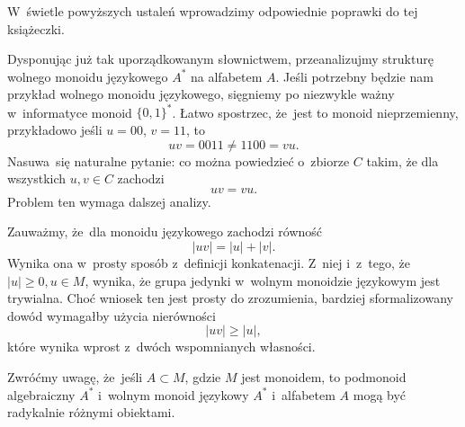 \documentclass[a4paper,11pt]{article}
\begin{document}
W~świetle powyższych ustaleń wprowadzimy odpowiednie poprawki do tej
książeczki.

\vspace{\spaceFour}





\start {} Dysponując już tak uporządkowanym słownictwem,
przeanalizujmy strukturę wolnego monoidu językowego $A^{ * }$ na
alfabetem $A$. Jeśli potrzebny będzie nam przykład wolnego monoidu
językowego, sięgniemy po niezwykle ważny w~informatyce monoid
$\{ 0, 1 \}^{ * }$. Łatwo spostrzec, że~jest to monoid nieprzemienny,
przykładowo jeśli $u = 00$, $v = 11$, to
\begin{equation}
  \label{eq:Forys-Forys-05}
  u v = 0011 \neq 1100 = vu.
\end{equation}
Nasuwa~się naturalne pytanie: co można powiedzieć o~zbiorze $C$ takim,
że dla wszystkich $u, v \in C$ zachodzi
\begin{equation}
  \label{eq:Forys-Forys-06}
  uv = vu.
\end{equation}
Problem ten wymaga dalszej analizy.

Zauważmy, że~dla monoidu językowego zachodzi równość
\begin{equation}
  \label{eq:Forys-Forys-07}
  | u v | = | u | + | v |.
\end{equation}
Wynika ona w~prosty sposób z~definicji konkatenacji. Z~niej i~z~tego,
że~$| u | \geq 0, u \in M$, wynika, że grupa jedynki w~wolnym
monoidzie językowym jest trywialna. Choć wniosek ten jest prosty do
zrozumienia, bardziej sformalizowany dowód wymagałby użycia
nierówności
\begin{equation}
  \label{eq:Forys-Forys-08}
  | u v | \geq | u |,
\end{equation}
które wynika wprost z~dwóch wspomnianych własności.

\vspace{\spaceFour}





 Zwróćmy uwagę, że~jeśli $A \subset M$, gdzie $M$ jest monoidem, to
podmonoid algebraiczny $A^{ * }$ i~wolnym monoid językowy $A^{ * }$
i~alfabetem $A$ mogą być radykalnie różnymi obiektami.
\end{document}
